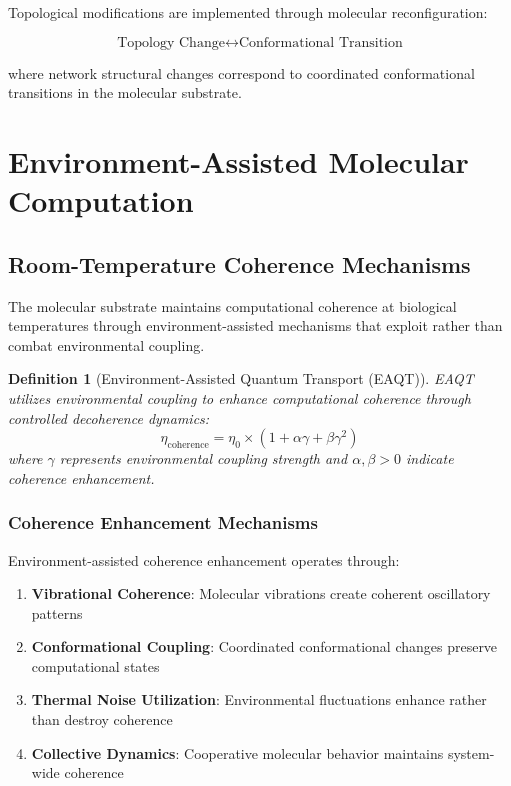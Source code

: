 \documentclass[12pt,a4paper]{article}
\newtheorem{definition}[theorem]{Definition}
\begin{document}
Topological modifications are implemented through molecular reconfiguration:

\begin{equation}
\text{Topology Change} \leftrightarrow \text{Conformational Transition}
\end{equation}

where network structural changes correspond to coordinated conformational transitions in the molecular substrate.

\section{Environment-Assisted Molecular Computation}

\subsection{Room-Temperature Coherence Mechanisms}

The molecular substrate maintains computational coherence at biological temperatures through environment-assisted mechanisms that exploit rather than combat environmental coupling.

\begin{definition}[Environment-Assisted Quantum Transport (EAQT)]
EAQT utilizes environmental coupling to enhance computational coherence through controlled decoherence dynamics:
\begin{equation}
\eta_{\text{coherence}} = \eta_0 \times (1 + \alpha\gamma + \beta\gamma^2)
\end{equation}
where $\gamma$ represents environmental coupling strength and $\alpha, \beta > 0$ indicate coherence enhancement.
\end{definition}

\subsubsection{Coherence Enhancement Mechanisms}

Environment-assisted coherence enhancement operates through:

\begin{enumerate}
\item \textbf{Vibrational Coherence}: Molecular vibrations create coherent oscillatory patterns
\item \textbf{Conformational Coupling}: Coordinated conformational changes preserve computational states
\item \textbf{Thermal Noise Utilization}: Environmental fluctuations enhance rather than destroy coherence
\item \textbf{Collective Dynamics}: Cooperative molecular behavior maintains system-wide coherence
\end{enumerate}
\end{document}
